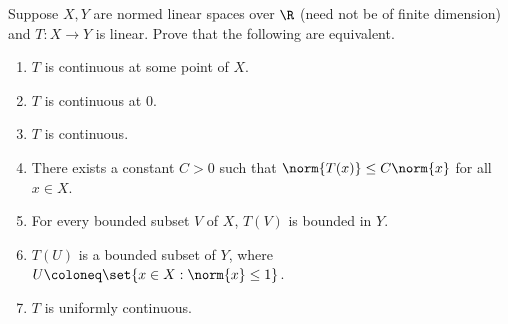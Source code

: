 \documentclass[12pt]{article}
\begin{document}
\setcounter{problem}{15}
\begin{problem} \label{prb:lin-cont}
    Suppose $X, Y$ are normed linear spaces over $\R$ (need not be of finite
    dimension) and $T\colon X \to Y$ is linear.
    Prove that the following are equivalent.
    \begin{enumerate}
        \item \label{prb:lin-cont:some}
            $T$ is continuous at some point of $X$.
        \item \label{prb:lin-cont:0}
            $T$ is continuous at $0$.
        \item \label{prb:lin-cont:cont}
            $T$ is continuous.
        \item \label{prb:lin-cont:Ox}
            There exists a constant $C > 0$ such that
            $\norm{T(x)} \le C\norm{x}$ for all $x \in X$.
        \item \label{prb:lin-cont:bounded}
            For every bounded subset $V$ of $X$, $T(V)$ is bounded in $Y$.
        \item \label{prb:lin-cont:U}
            $T(U)$ is a bounded subset of $Y$, where
            $U \coloneq \set{x \in X : \norm{x} \le 1}$.
        \item \label{prb:lin-cont:unif}
            $T$ is uniformly continuous.
    \end{enumerate}
\end{problem}
\end{document}
